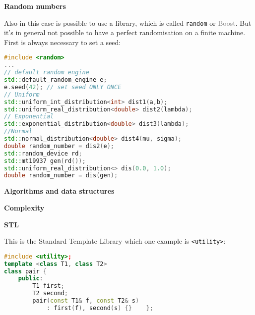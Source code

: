 \documentclass[fontsize=8pt, a4paper, landscape, fleqn]{scrartcl}
\renewcommand{\section}[1]{%
    \noindent\colorbox{sectioncolor}{%
        \parbox{\dimexpr\columnwidth-2\fboxsep}{\color{white}\textbf{#1}}}%
    \vspace{0.5mm}%
}
\renewcommand{\subsection}[1]{%
    \noindent\colorbox{subsectioncolor}{%
        \parbox{\dimexpr\columnwidth-2\fboxsep}{\color{white}\textbf{#1}}}%
    \vspace{0.5mm}%
}
\begin{document}
\begin{multicols*}{3}[\raggedcolumns]
 
	\section{Random numbers}
    Also in this case is possible to use a library, which is called \lstinline{random} or \textcolor{gray}{Boost}. But it's in general not possible to have a perfect randomisation on a finite machine.
	First is always necessary to set a seed:

 \begin{lstlisting}[language=C++, breaklines]
#include <random>
...
// default random engine
std::default_random_engine e;
e.seed(42); // set seed ONLY ONCE 
// Uniform
std::uniform_int_distribution<int> dist1(a,b);
std::uniform_real_distribution<double> dist2(lambda);
// Exponential
std::exponential_distribution<double> dist3(lambda);
//Normal
std::normal_distribution<double> dist4(mu, sigma);
double random_number = dis2(e);
std::random_device rd;
std::mt19937 gen(rd());
std::uniform_real_distribution<> dis(0.0, 1.0);
double random_number = dis(gen);\end{lstlisting}

    \section{Algorithms and data structures}
	\subsection{Complexity}
    
    \subsection{STL}
    
    This is the Standard Template Library which one example is \lstinline{<utility>}:
        \begin{lstlisting}[language=C++, breaklines, emph={typedef}, emphstyle={\color{red}}]
#include <utility>;
template <class T1, class T2>
class pair {
    public:
        T1 first;
        T2 second;
        pair(const T1& f, const T2& s) 
            : first(f), second(s) {}    }; \end{lstlisting}


\end{multicols*}
\end{document}
